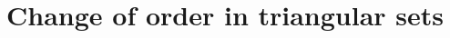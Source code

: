\newcommand{\AS}[1]{\mathcal{#1}}  %
\newcommand{\biv}[1]{\mathfrak{#1}}  %
\newcommand{\vect}[1]{\vec{#1}}  %

\part{Change of order in triangular sets}















